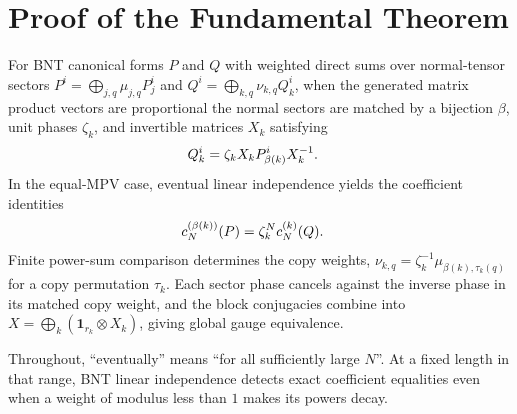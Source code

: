 \chapter{Proof of the Fundamental Theorem}\label{ch:ft_proof}

For BNT canonical forms $P$ and $Q$ with weighted direct sums over
normal-tensor sectors $P^i=\bigoplus_{j,q}\mu_{j,q}P_j^i$ and
$Q^i=\bigoplus_{k,q}\nu_{k,q}Q_k^i$, when the generated matrix product vectors
are proportional the normal sectors are matched by a bijection $\beta$, unit
phases $\zeta_k$, and invertible matrices $X_k$ satisfying
\begin{align}
    Q_k^i
     & =\zeta_kX_kP_{\beta(k)}^iX_k^{-1}.
    \notag
\end{align}
In the equal-MPV case, eventual linear independence yields the coefficient
identities
\begin{align}
    c_N^{(\beta(k))}(P)
     & =\zeta_k^N c_N^{(k)}(Q).
    \notag
\end{align}
Finite power-sum comparison determines the copy weights,
$\nu_{k,q}=\zeta_k^{-1}\mu_{\beta(k),\tau_k(q)}$ for a copy permutation
$\tau_k$. Each sector phase cancels against the inverse phase in its matched
copy weight, and the block conjugacies combine into
$X=\bigoplus_k(\mathbf 1_{r_k}\otimes X_k)$, giving global gauge equivalence.

Throughout, ``eventually'' means ``for all sufficiently large $N$''. At a
fixed length in that range, BNT linear independence detects exact coefficient
equalities even when a weight of modulus less than $1$ makes its powers decay.





